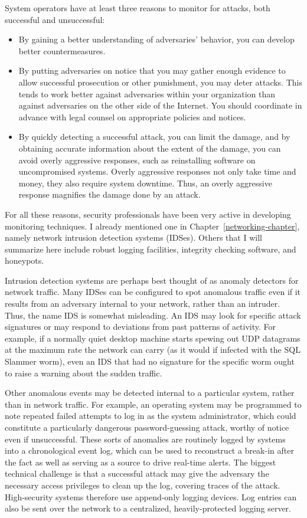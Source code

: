 System operators have at least three reasons to monitor for attacks,
both successful and unsuccessful:
\begin{itemize}
\item
By gaining a better understanding of adversaries' behavior, you can
develop better countermeasures.
\item
By putting adversaries on notice that you may gather enough evidence
to allow successful prosecution or other punishment, you may deter
attacks.  This tends to work better against adversaries within your
organization than against adversaries on the other side of the
Internet.  You should coordinate in advance with legal counsel on
appropriate policies and notices.
\item
By quickly detecting a successful attack, you can limit the damage, and
by obtaining accurate information about the extent of the damage, you
can avoid overly aggressive responses, such as reinstalling software
on uncompromised systems.  Overly aggressive responses not only take
time and money, they also require system downtime.  Thus, an overly
aggressive response magnifies the damage done by an attack.
\end{itemize}

For all these reasons, security professionals have been very active in
developing monitoring techniques.  I already mentioned one in
Chapter~\ref{networking-chapter}, namely network intrusion detection
systems (IDSes).  Others that I will summarize here include robust
logging facilities, integrity checking software, and honeypots.

Intrusion detection systems are perhaps best thought of as anomaly
detectors for network traffic.  Many IDSes can be configured to spot
anomalous traffic even if it results from an adversary internal to
your network, rather than an intruder.  Thus, the name IDS is somewhat
misleading.  An IDS may look for specific attack signatures or may
respond to deviations from past patterns of activity.  For example, if
a normally quiet desktop machine starts spewing out UDP datagrams at the
maximum rate the network can carry (as it would if infected with the
SQL Slammer worm), even an IDS that had no signature for the specific
worm ought to raise a warning about the sudden traffic.

Other anomalous events may be detected internal to a particular
system, rather than in network traffic.  For example, an operating
system may be programmed to note repeated failed attempts to log in as
the system administrator, which could constitute a particularly
dangerous password-guessing attack, worthy of notice even if
unsuccessful.  These sorts of anomalies are routinely logged by systems
into a chronological event log, which can be used to reconstruct a
break-in after the fact as well as serving as a source to drive
real-time alerts.  The biggest technical challenge is that a
successful attack may give the adversary the necessary access privileges
to clean up the log, covering traces of the attack.  High-security
systems therefore use append-only logging devices.  Log entries can
also be sent over the network to a centralized, heavily-protected
logging server.

